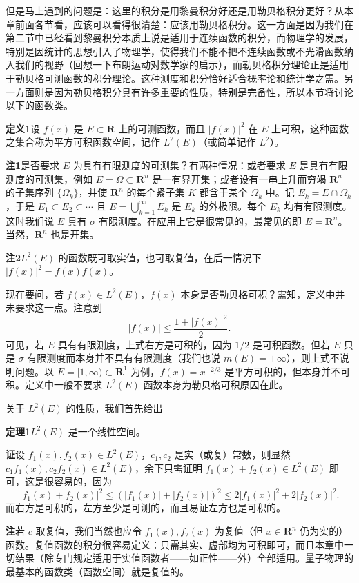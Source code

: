 但是马上遇到的问题是：这里的积分是用黎曼积分好还是用勒贝格积分更好？从本章前面各节看，应该可以看得很清楚：应该用勒贝格积分。这一方面是因为我们在第二节中已经看到黎曼积分本质上说是适用于连续函数的积分，而物理学的发展，特别是因统计的思想引入了物理学，使得我们不能不把不连续函数或不光滑函数纳入我们的视野（回想一下布朗运动对数学家的启示），而勒贝格积分理论正是适用于勒贝格可测函数的积分理论。这种测度和积分恰好适合概率论和统计学之需。另一方面则是因为勒贝格积分具有许多重要的性质，特别是完备性，所以本节将讨论以下的函数类。

\noindent\textbf{定义1}\quad 设 $f(x)$ 是 $E\subset\mathbf R$ 上的可测函数，而且 $|f(x)|^2$ 在 $E$ 上可积，这种函数之集合称为平方可积函数空间，记作 $L^2(E)$（或简单记作 $L^2$）。

\noindent\textbf{注1}\quad 是否要求 $E$ 为具有有限测度的可测集？有两种情况：或者要求 $E$ 是具有有限测度的可测集，例如 $E=\Omega\subset\mathbf R^n$ 是一有界开集；或者设有一串上升而穷竭 $\mathbf R^n$ 的子集序列 $\{\Omega_k\}$，并使 $\mathbf R^n$ 的每个紧子集 $K$ 都含于某个 $\Omega_k$ 中。记 $E_k=E\cap\Omega_k$，于是 $E_1\subset E_2\subset\cdots$ 且 $E=\bigcup_{k=1}^{\infty}E_k$ 是 $E_k$ 的外极限。每个 $E_k$ 均有有限测度。这时我们说 $E$ 具有 $\sigma$ 有限测度。在应用上它是很常见的，最常见的即 $E=\mathbf R^n$。当然，$\mathbf R^n$ 也是开集。

\noindent\textbf{注2}\quad $L^2(E)$ 的函数既可取实值，也可取复值，在后一情况下 $|f(x)|^2=f(x)\overline{f(x)}$。

现在要问，若 $f(x)\in L^2(E)$，$f(x)$ 本身是否勒贝格可积？需知，定义中并未要求这一点。注意到
\[
 |f(x)|\le \frac{1+|f(x)|^2}{2}.
\]
可见，若 $E$ 具有有限测度，上式右方是可积的，因为 $1/2$ 是可积函数。但若 $E$ 只是 $\sigma$ 有限测度而本身并不具有有限测度（我们也说 $m(E)=+\infty$），则上式不说明问题。以 $E=[1,\infty)\subset\mathbf R^1$ 为例，$f(x)=x^{-2/3}$ 是平方可积的，但本身并不可积。定义中一般不要求 $L^2(E)$ 函数本身为勒贝格可积原因在此。

关于 $L^2(E)$ 的性质，我们首先给出

\noindent\textbf{定理1}\quad $L^2(E)$ 是一个线性空间。

\noindent\textbf{证}\quad 设 $f_1(x),f_2(x)\in L^2(E)$，$c_1,c_2$ 是实（或复）常数，则显然 $c_1f_1(x),c_2f_2(x)\in L^2(E)$，余下只需证明 $f_1(x)+f_2(x)\in L^2(E)$ 即可，这是很容易的，因为
\[
 |f_1(x)+f_2(x)|^2\le (|f_1(x)|+|f_2(x)|)^2\le 2|f_1(x)|^2+2|f_2(x)|^2.
\]
而右方是可积的，左方至少是可测的，而且易证左方也是可积的。

\noindent\textbf{注}\quad 若 $c$ 取复值，我们当然也应令 $f_1(x),f_2(x)$ 为复值（但 $x\in\mathbf R^n$ 仍为实的）函数。复值函数的积分很容易定义：只需其实、虚部均为可积即可，而且本章中一切结果（除专门规定适用于实值函数者——如正性——外）全部适用。量子物理的最基本的函数类（函数空间）就是复值的。

